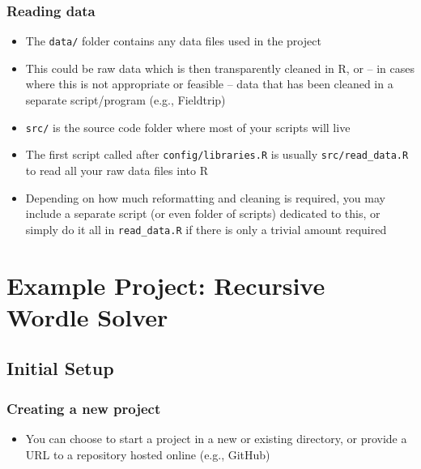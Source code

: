 \documentclass[
]{article}
\providecommand{\tightlist}{%
  \setlength{\itemsep}{0pt}\setlength{\parskip}{0pt}}
\begin{document}
\hypertarget{reading-data}{%
\subsubsection{Reading data}\label{reading-data}}

\begin{itemize}
\item
  The \texttt{data/} folder contains any data files used in the project
\item
  This could be raw data which is then transparently cleaned in R, or --
  in cases where this is not appropriate or feasible -- data that has
  been cleaned in a separate script/program (e.g., Fieldtrip)
\item
  \texttt{src/} is the source code folder where most of your scripts
  will live
\item
  The first script called after \texttt{config/libraries.R} is usually
  \texttt{src/read\_data.R} to read all your raw data files into R
\item
  Depending on how much reformatting and cleaning is required, you may
  include a separate script (or even folder of scripts) dedicated to
  this, or simply do it all in \texttt{read\_data.R} if there is only a
  trivial amount required
\end{itemize}

\newpage

\hypertarget{example-project-recursive-wordle-solver}{%
\section{Example Project: Recursive Wordle
Solver}\label{example-project-recursive-wordle-solver}}

\hypertarget{initial-setup}{%
\subsection{Initial Setup}\label{initial-setup}}

\hypertarget{creating-a-new-project}{%
\subsubsection{Creating a new project}\label{creating-a-new-project}}

\begin{itemize}
\tightlist
\item
  You can choose to start a project in a new or existing directory, or
  provide a URL to a repository hosted online (e.g., GitHub)
\end{itemize}
\end{document}
